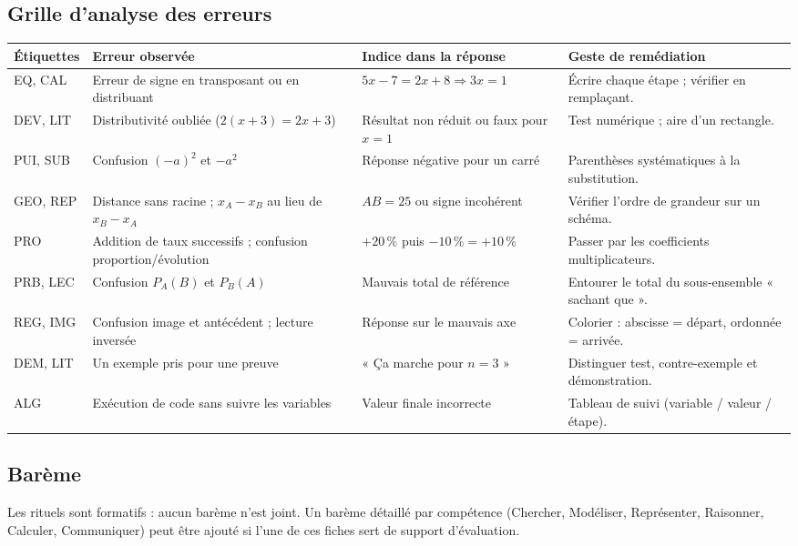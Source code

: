 \subsection*{Grille d'analyse des erreurs}
{\footnotesize\renewcommand{\arraystretch}{1.2}
\begin{tabular}{@{}p{2.2cm} p{4.4cm} p{4.8cm} p{4.6cm}@{}}\toprule
Étiquettes & Erreur observée & Indice dans la réponse & Geste de remédiation \\ \midrule
EQ, CAL & Erreur de signe en transposant ou en distribuant & $5x-7=2x+8\Rightarrow3x=1$ & Écrire chaque étape ; vérifier en remplaçant. \\
DEV, LIT & Distributivité oubliée ($2(x+3)=2x+3$) & Résultat non réduit ou faux pour $x=1$ & Test numérique ; aire d'un rectangle. \\
PUI, SUB & Confusion $(-a)^2$ et $-a^2$ & Réponse négative pour un carré & Parenthèses systématiques à la substitution. \\
GEO, REP & Distance sans racine ; $x_A-x_B$ au lieu de $x_B-x_A$ & $AB=25$ ou signe incohérent & Vérifier l'ordre de grandeur sur un schéma. \\
PRO & Addition de taux successifs ; confusion proportion/évolution & $+20\,\%$ puis $-10\,\%=+10\,\%$ & Passer par les coefficients multiplicateurs. \\
PRB, LEC & Confusion $P_A(B)$ et $P_B(A)$ & Mauvais total de référence & Entourer le total du sous-ensemble « sachant que ». \\
REG, IMG & Confusion image et antécédent ; lecture inversée & Réponse sur le mauvais axe & Colorier : abscisse = départ, ordonnée = arrivée. \\
DEM, LIT & Un exemple pris pour une preuve & « Ça marche pour $n=3$ » & Distinguer test, contre-exemple et démonstration. \\
ALG & Exécution de code sans suivre les variables & Valeur finale incorrecte & Tableau de suivi (variable / valeur / étape). \\ \bottomrule
\end{tabular}}

\subsection*{Barème}
Les rituels sont formatifs : aucun barème n'est joint. Un barème détaillé par compétence (Chercher, Modéliser, Représenter, Raisonner, Calculer, Communiquer) peut être ajouté si l'une de ces fiches sert de support d'évaluation.

